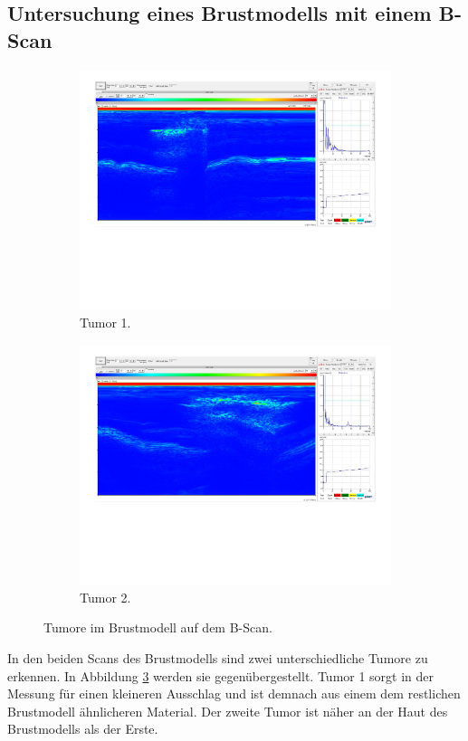 \subsection{Untersuchung eines Brustmodells mit einem B-Scan}%
\label{sec:ausw_brust}
\begin{figure}%
    \begin{subfigure}{0.48\textwidth}%
        \centering%
        \includegraphics[width=\textwidth]{Messdaten/Tumor 1D.pdf}%
        \caption{Tumor 1.}%
        \label{fig:tumor_1}%
    \end{subfigure}%
    \begin{subfigure}{0.48\textwidth}%
        \centering%
        \includegraphics[width=\textwidth]{Messdaten/Tumor 2B.pdf}%
        \caption{Tumor 2.}%
        \label{fig:tumor_2}%
    \end{subfigure}%
    \caption{Tumore im Brustmodell auf dem B-Scan.}%
    \label{fig:tumore}
\end{figure}%

In den beiden Scans des Brustmodells sind zwei unterschiedliche Tumore zu erkennen.
In Abbildung \ref{fig:tumore} werden sie gegenübergestellt.
Tumor 1 sorgt in der Messung für einen kleineren Ausschlag und ist demnach aus einem dem restlichen Brustmodell ähnlicheren Material.
Der zweite Tumor ist näher an der Haut des Brustmodells als der Erste.